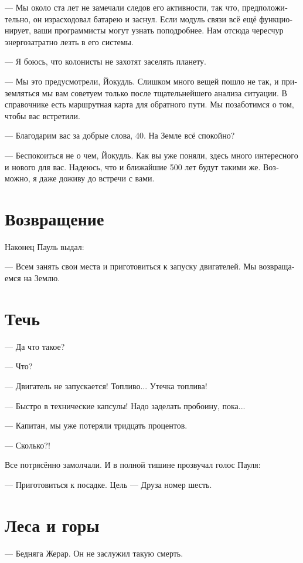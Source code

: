 \documentclass[a4paper,12pt,fleqn]{book}\usepackage{polyglossia}\setdefaultlanguage[babelshorthands=true]{russian}\setotherlanguage{english}\defaultfontfeatures{Ligatures=TeX,Mapping=tex-text}\usepackage{xcolor}\newcommand{\ml}[3]{#2}
\begin{document}
--- Мы около ста лет не замечали следов его активности, так что, предположительно, он израсходовал батарею и заснул.
Если модуль связи всё ещё функционирует, ваши программисты могут узнать поподробнее.
Нам отсюда чересчур энергозатратно лезть в его системы.

--- Я боюсь, что колонисты не захотят заселять планету.

--- Мы это предусмотрели, Йокудль.
Слишком много вещей пошло не так, и приземляться мы вам советуем только после тщательнейшего анализа ситуации.
В справочнике есть маршрутная карта для обратного пути.
Мы позаботимся о том, чтобы вас встретили.

--- Благодарим вас за добрые слова, 40.
На Земле всё спокойно?

--- Беспокоиться не о чем, Йокудль.
Как вы уже поняли, здесь много интересного и нового для вас.
Надеюсь, что и ближайшие 500 лет будут такими же.
Возможно, я даже доживу до встречи с вами.

\section{Возвращение}

Наконец Пауль выдал:

--- Всем занять свои места и приготовиться к запуску двигателей.
Мы возвращаемся на Землю.

\section{Течь}

--- Да что такое?

--- Что?

--- Двигатель не запускается!
Топливо...
Утечка топлива!

--- Быстро в технические капсулы!
Надо заделать пробоину, пока...

--- Капитан, мы уже потеряли тридцать процентов.

--- Сколько?!

Все потрясённо замолчали.
И в полной тишине прозвучал голос Пауля:

--- Приготовиться к посадке.
Цель --- Друза номер шесть.

\section{Леса и горы}

--- Бедняга Жерар.
Он не заслужил такую смерть.
\end{document}

